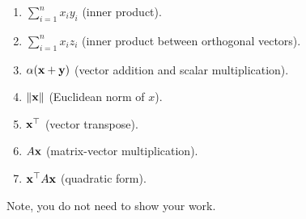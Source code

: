     \begin{enumerate}
        \item $\sum_{i=1}^n x_iy_i$ (inner product).
        
        \item $\sum_{i=1}^n x_iz_i$ (inner product between orthogonal vectors).
        
        \item $\alpha(\mathbf{x}+\mathbf{y})$ (vector addition and scalar multiplication).

        \item $\left\|\mathbf{x} \right\|$ (Euclidean norm of $x$).
        
        \item $\mathbf{x}^\top$ (vector transpose).

        \item $A\mathbf{x}$ (matrix-vector multiplication).
        
        \item $\mathbf{x}^\top A\mathbf{x}$ (quadratic form).
    \end{enumerate}
    Note, you do not need to show your work. 

